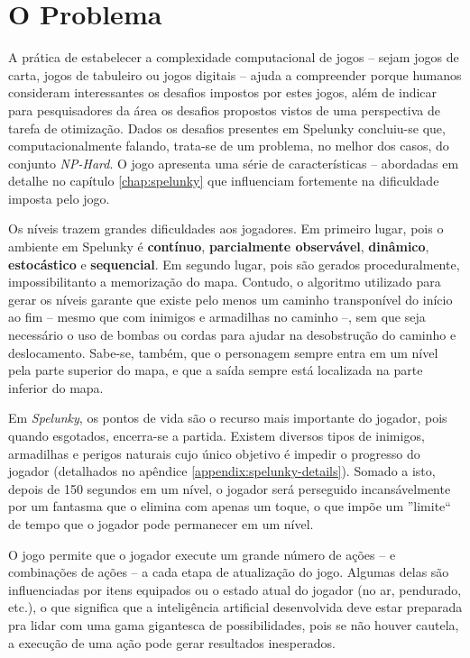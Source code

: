\chapter{\label{chap:problem}O Problema}
A prática de estabelecer a complexidade computacional de jogos -- sejam jogos de
carta, jogos de tabuleiro ou jogos digitais -- ajuda a compreender  porque
humanos consideram interessantes os desafios impostos por estes jogos, além de
indicar para pesquisadores da área os desafios propostos vistos de uma
perspectiva de tarefa de otimização.  Dados os desafios presentes em Spelunky
concluiu-se que, computacionalmente falando, trata-se de um problema, no melhor
dos casos, do conjunto \textit{NP-Hard}\cite{SPELUNKYHARD}. O jogo apresenta uma
série de características -- abordadas em detalhe no capítulo \ref{chap:spelunky}
que influenciam fortemente na dificuldade imposta pelo jogo.

Os níveis trazem grandes dificuldades aos jogadores. Em primeiro lugar, pois o
ambiente em Spelunky é \textbf{contínuo}, \textbf{parcialmente observável},
\textbf{dinâmico}, \textbf{estocástico} e \textbf{sequencial}. Em segundo
lugar, pois são gerados proceduralmente, impossibilitanto a memorização do
mapa.  Contudo, o algoritmo utilizado para gerar os níveis garante que existe
pelo menos um caminho transponível do início ao fim -- mesmo que com inimigos e
armadilhas no caminho --, sem que seja necessário o uso de bombas ou cordas
para ajudar na desobstrução do caminho e deslocamento. Sabe-se, também, que o
personagem sempre entra em um nível pela parte superior do mapa, e que a saída
sempre está localizada na parte inferior do mapa.

Em \textit{Spelunky}, os pontos de vida são o recurso mais importante do
jogador, pois quando esgotados, encerra-se a partida. Existem diversos tipos de
inimigos, armadilhas e perigos naturais cujo único objetivo é impedir o
progresso do jogador (detalhados no apêndice \ref{appendix:spelunky-details}).
Somado a isto, depois de 150 segundos em um nível, o jogador será perseguido
incansávelmente por um fantasma que o elimina com apenas um toque, o que impõe
um ''limite`` de tempo que o jogador pode permanecer em um nível.

O jogo permite que o jogador execute um grande número de ações -- e combinações
de ações -- a cada etapa de atualização do jogo. Algumas delas são influenciadas
por itens equipados ou o estado atual do jogador (no ar, pendurado, etc.), o que
significa que a inteligência artificial desenvolvida deve estar preparada pra
lidar com uma gama gigantesca de possibilidades, pois se não houver cautela, a
execução de uma ação pode gerar resultados inesperados. 

